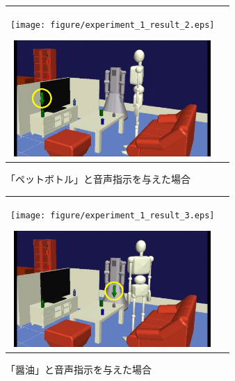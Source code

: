 %
\begin{figure}[htbp]
\begin{tabular}{cc}
%
  \begin{minipage}{0.5\textwidth}
    \begin{center}
      \texttt{[image: figure/experiment\_1\_result\_2.eps]}
    \end{center}
  \end{minipage}
%
  \begin{minipage}{0.5\textwidth}
    \begin{center}
      \includegraphics[width=75mm]{figure/experiment_1_result_2_s.eps}
    \end{center}
  \end{minipage}
%
\end{tabular}
\caption{「ペットボトル」と音声指示を与えた場合}
\label{fig:experiment_1_result_2}
\end{figure}
%
\begin{figure}[htbp]
\begin{tabular}{cc}
%
  \begin{minipage}{0.5\textwidth}
    \begin{center}
      \texttt{[image: figure/experiment\_1\_result\_3.eps]}
    \end{center}
  \end{minipage}
%
  \begin{minipage}{0.5\textwidth}
    \begin{center}
      \includegraphics[width=75mm]{figure/experiment_1_result_3_s.eps}
    \end{center}
  \end{minipage}
%
\end{tabular}
\caption{「醤油」と音声指示を与えた場合}
\label{fig:experiment_1_result_3}
\end{figure}